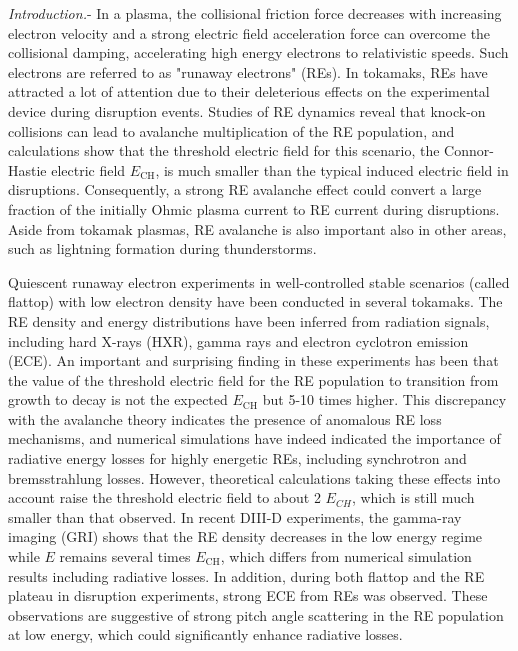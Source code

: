 \documentclass[aps, prl, preprint,english,superscriptaddress]{revtex4-1}
\begin{document}
\textit{Introduction.}-
In a plasma, the collisional friction force decreases with increasing electron velocity and a strong electric field acceleration force can overcome the collisional damping, accelerating high energy electrons to relativistic speeds. Such electrons are referred to as "runaway electrons" (REs). In tokamaks, REs have attracted a lot of attention due to their deleterious effects on the experimental device during disruption events\cite{knoepfel_runaway_1979,boozer_theory_2015}. Studies of RE dynamics reveal that knock-on collisions can lead to avalanche multiplication of the RE population\cite{rosenbluth_theory_1997}, and calculations show that the threshold electric field for this scenario, the Connor-Hastie electric field $E_{\mathrm{CH}}$\cite{connor_relativistic_1975}, is much smaller than the typical induced electric field in disruptions. Consequently, a strong RE avalanche effect could convert a large fraction of the initially Ohmic plasma current to RE current during disruptions. Aside from tokamak plasmas, RE avalanche is also important also in other areas, such as lightning formation during thunderstorms\cite{gurevich_runaway_1992}.

Quiescent runaway electron experiments in well-controlled stable scenarios (called flattop) with low electron density have been conducted in several tokamaks\cite{fussmann_long-pulse_1981,paz-soldan_growth_2014,zhou_investigation_2013}. The RE density and energy distributions have been inferred from radiation signals, including hard X-rays (HXR), gamma rays and electron cyclotron emission (ECE). An important and surprising finding in these experiments has been that the value of the threshold electric field for the RE population to transition from growth to decay is not the expected $E_{\mathrm{CH}}$\cite{granetz_itpa_2014,paz-soldan_growth_2014} but 5-10 times higher. This discrepancy with the avalanche theory indicates the presence of anomalous RE loss mechanisms, and numerical simulations have indeed indicated the importance of radiative energy losses for highly energetic REs, including synchrotron\cite{andersson_damping_2001,stahl_effective_2015} and bremsstrahlung losses\cite{bakhtiari_role_2005,embreus_effect_2016}. However, theoretical calculations taking these effects into account raise the threshold electric field to about 2 $E_{CH}$, which is still much smaller than that observed. In recent DIII-D experiments\cite{paz-soldan_spatiotemporal_2017}, the gamma-ray imaging (GRI) shows that the RE density decreases in the low energy regime while $E$ remains several times $E_{\mathrm{CH}}$, which differs from numerical simulation results including radiative losses. In addition, during both flattop\cite{paz-soldan_non-thermal_2016} and the RE plateau in disruption experiments\cite{fredrickson_control_2015}, strong ECE from REs was observed. These observations are suggestive of strong pitch angle scattering in the RE population at low energy, which could significantly enhance radiative losses.
\end{document}

